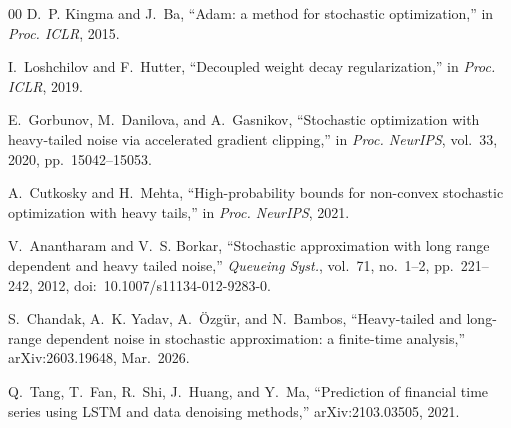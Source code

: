 \documentclass[conference]{IEEEtran}
\begin{document}
\begin{thebibliography}{00}
D.~P. Kingma and J.~Ba, ``Adam: a method for stochastic
optimization,'' in \textit{Proc. ICLR}, 2015.

I.~Loshchilov and F.~Hutter, ``Decoupled weight decay
regularization,'' in \textit{Proc. ICLR}, 2019.

E.~Gorbunov, M.~Danilova, and A.~Gasnikov, ``Stochastic optimization
with heavy-tailed noise via accelerated gradient clipping,'' in
\textit{Proc. NeurIPS}, vol.~33, 2020, pp.~15042--15053.

A.~Cutkosky and H.~Mehta, ``High-probability bounds for non-convex
stochastic optimization with heavy tails,'' in \textit{Proc. NeurIPS},
2021.

V.~Anantharam and V.~S. Borkar, ``Stochastic approximation with long
range dependent and heavy tailed noise,'' \textit{Queueing Syst.},
vol.~71, no.~1--2, pp.~221--242, 2012,
doi:~10.1007/s11134-012-9283-0.

S.~Chandak, A.~K. Yadav, A.~\"{O}zg\"{u}r, and N.~Bambos,
``Heavy-tailed and long-range dependent noise in stochastic
approximation: a finite-time analysis,'' arXiv:2603.19648, Mar.\ 2026.

Q.~Tang, T.~Fan, R.~Shi, J.~Huang, and Y.~Ma, ``Prediction of
financial time series using LSTM and data denoising methods,''
arXiv:2103.03505, 2021.

\end{thebibliography}
\end{document}

